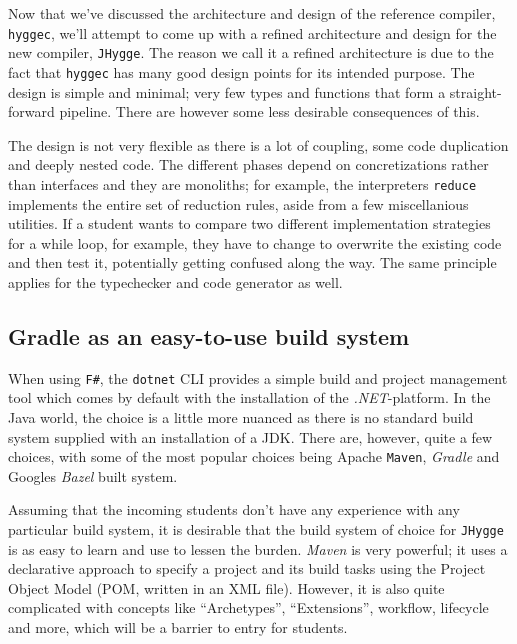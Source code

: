 Now that we've discussed the architecture and design of the reference compiler, \texttt{hyggec}, we'll attempt to come up with
a refined architecture and design for the new compiler, \texttt{JHygge}. The reason we call it a refined architecture is due to
the fact that \texttt{hyggec} has many good design points for its intended purpose. The design is simple and minimal; very
few types and functions that form a straight-forward pipeline. There are however some less desirable consequences of this.

The design is not very flexible as there is a lot of coupling, some code duplication and deeply nested code. The different
phases depend on concretizations rather than interfaces and they are monoliths; for example, the interpreters \texttt{reduce}
implements the entire set of reduction rules, aside from a few miscellanious utilities. If a student wants to compare two different
implementation strategies for a while loop, for example, they have to change to overwrite the existing code and then test it,
potentially getting confused along the way. The same principle applies for the typechecker and code generator as well.

\subsection{Gradle as an easy-to-use build system}

When using \texttt{F\#}, the \texttt{dotnet} CLI provides a simple build and project management tool which comes by default
with the installation of the \textit{.NET}-platform. In the Java world, the choice is a little more nuanced as there is
no standard build system supplied with an installation of a JDK. There are, however, quite a few choices, with some of the
most popular choices being Apache \texttt{Maven}, \textit{Gradle} and Googles \textit{Bazel} built system.

Assuming that the incoming students don't have any experience with any particular build system, it is desirable that the
build system of choice for \texttt{JHygge} is as easy to learn and use to lessen the burden. \textit{Maven} is very
powerful; it uses a declarative approach to specify a project and its build tasks using the Project Object Model (POM,
written in an XML file).
However, it is also quite complicated with concepts like ``Archetypes'', ``Extensions'', workflow, lifecycle and more,
which will be a barrier to entry for students.

